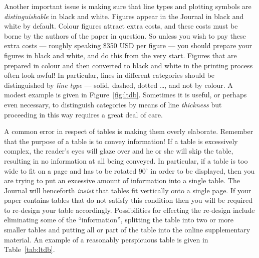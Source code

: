 \documentclass[times, doublespace]{anzsauth}
\begin{document}
Another important issue is making sure that line types and
plotting symbols are \emph{distinguishable} in black and white.
Figures appear in the Journal in black and white by default.
Colour figures attract extra costs, and these costs must be borne by
the authors of the paper in question.  So unless you wish to pay
these extra costs --- roughly speaking \$350 USD per figure
--- you should prepare your figures in black and white, and do
this from the very start. Figures that are prepared in colour and
then converted to black and white in the printing process often
look awful! In particular, lines in different categories should be
distinguished by \emph{line type} --- solid, dashed, dotted \ldots,
and not by colour.  A modest example is given in
Figure~\ref{fig:ltdb}.  Sometimes it is useful, or perhaps
even necessary, to distinguish categories by means of line
\emph{thickness} but proceeding in this way requires a great deal
of care.

A common error in respect of tables is making them overly elaborate.
Remember that the purpose of a table is to convey information! If
a table is excessively complex, the reader's eyes will glaze over
and he or she will skip the table, resulting in no information at
all being conveyed.  In particular, if a table is too wide to fit
on a page and has to be rotated 90$^\circ$ in order to be displayed,
then you are trying to put an excessive amount of information into
a single table.  The Journal will henceforth \emph{insist} that
tables fit vertically onto a single page.  If your paper contains
tables that do not satisfy this condition then you will be required
to re-design your table accordingly.  Possibilities for effecting the
re-design include eliminating some of the ``information'', splitting
the table into two or more smaller tables and putting all or part
of the table into the online supplementary material.  An example
of a reasonably perspicuous table is given in Table~\ref{tab:ltdb}.
\end{document}
